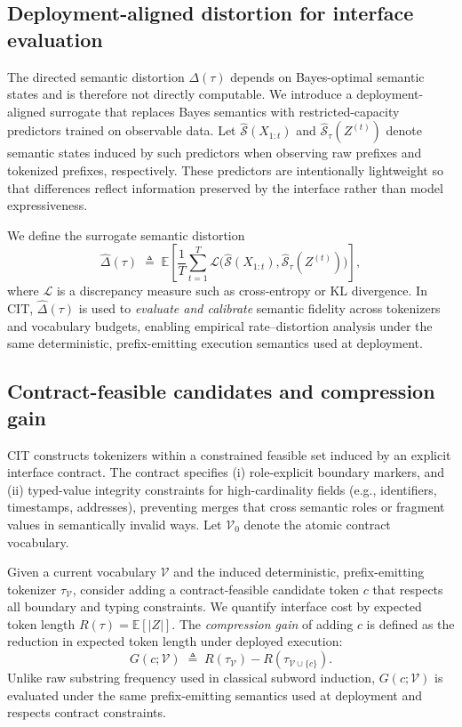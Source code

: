 \subsection{Deployment-aligned distortion for interface evaluation}
\label{sec:alg_relaxation}

The directed semantic distortion $\Delta(\tau)$ depends on Bayes-optimal semantic states and is therefore not directly computable.
We introduce a deployment-aligned surrogate that replaces Bayes semantics with restricted-capacity predictors trained on observable data.
Let $\widehat{\mathcal{S}}(X_{1:t})$ and $\widehat{\mathcal{S}}_\tau(Z^{(t)})$ denote semantic states induced by such predictors when observing raw prefixes and tokenized prefixes, respectively.
These predictors are intentionally lightweight so that differences reflect information preserved by the interface rather than model expressiveness.

We define the surrogate semantic distortion
\begin{equation}
\widehat{\Delta}(\tau)
\;\triangleq\;
\mathbb{E}\!\left[
\frac{1}{T}
\sum_{t=1}^{T}
\mathcal{L}\big(
\widehat{\mathcal{S}}(X_{1:t}),
\widehat{\mathcal{S}}_\tau(Z^{(t)})
\big)
\right],
\label{eq:surrogate_distortion}
\end{equation}
where $\mathcal{L}$ is a discrepancy measure such as cross-entropy or KL divergence.
In CIT, $\widehat{\Delta}(\tau)$ is used to \emph{evaluate and calibrate} semantic fidelity across tokenizers and vocabulary budgets, enabling empirical rate--distortion analysis under the same deterministic, prefix-emitting execution semantics used at deployment.


\subsection{Contract-feasible candidates and compression gain}
\label{sec:alg_marginal}

CIT constructs tokenizers within a constrained feasible set induced by an explicit interface contract.
The contract specifies (i) role-explicit boundary markers, and (ii) typed-value integrity constraints for high-cardinality fields (e.g., identifiers, timestamps, addresses), preventing merges that cross semantic roles or fragment values in semantically invalid ways.
Let $\mathcal{V}_0$ denote the atomic contract vocabulary.

Given a current vocabulary $\mathcal{V}$ and the induced deterministic, prefix-emitting tokenizer $\tau_{\mathcal{V}}$, consider adding a contract-feasible candidate token $c$ that respects all boundary and typing constraints.
We quantify interface cost by expected token length $R(\tau)=\mathbb{E}[|Z|]$.
The \emph{compression gain} of adding $c$ is defined as the reduction in expected token length under deployed execution:
\begin{equation}
G(c;\mathcal{V})
\;\triangleq\;
R(\tau_{\mathcal{V}}) - R(\tau_{\mathcal{V}\cup\{c\}}).
\label{eq:gain_def}
\end{equation}
Unlike raw substring frequency used in classical subword induction, $G(c;\mathcal{V})$ is evaluated under the same prefix-emitting semantics used at deployment and respects contract constraints.

